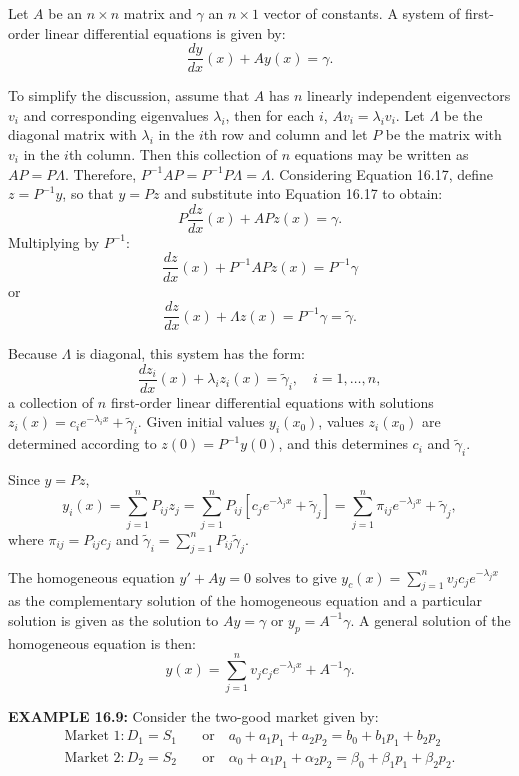 \begin{original}
Let $A$ be an $n \times n$ matrix and $\gamma$ an $n \times 1$ vector of constants. A system of first-order linear differential equations is given by:
\[
\frac{dy}{dx}(x) + A y(x) = \gamma. \tag{16.17}
\]

To simplify the discussion, assume that $A$ has $n$ linearly independent eigenvectors $v_i$ and corresponding eigenvalues $\lambda_i$, then for each $i$, $A v_i = \lambda_i v_i$. Let $\Lambda$ be the diagonal matrix with $\lambda_i$ in the $i$th row and column and let $P$ be the matrix with $v_i$ in the $i$th column. Then this collection of $n$ equations may be written as $AP = P\Lambda$. Therefore, $P^{-1}AP = P^{-1}P\Lambda = \Lambda$. Considering Equation 16.17, define $z = P^{-1} y$, so that $y = P z$ and substitute into Equation 16.17 to obtain:
\[
P\frac{dz}{dx}(x) + AP z(x) = \gamma.
\]
Multiplying by $P^{-1}$:
\[
\frac{dz}{dx}(x) + P^{-1}AP z(x) = P^{-1}\gamma
\]
or
\[
\frac{dz}{dx}(x) + \Lambda z(x) = P^{-1}\gamma = \tilde{\gamma}.
\]

Because $\Lambda$ is diagonal, this system has the form:
\[
\frac{dz_i}{dx}(x) + \lambda_i z_i(x) = \tilde{\gamma}_i, \quad i = 1, \ldots, n, \tag{16.18}
\]
a collection of $n$ first-order linear differential equations with solutions $z_i(x) = c_i e^{-\lambda_i x} + \tilde{\gamma}_i$. Given initial values $y_i(x_0)$, values $z_i(x_0)$ are determined according to $z(0) = P^{-1} y(0)$, and this determines $c_i$ and $\tilde{\gamma}_i$.

Since $y = P z$,
\[
y_i(x) = \sum_{j=1}^{n} P_{ij} z_j = \sum_{j=1}^{n} P_{ij}[c_j e^{-\lambda_j x} + \tilde{\gamma}_j] = \sum_{j=1}^{n} \pi_{ij} e^{-\lambda_j x} + \tilde{\gamma}_j, \tag{16.19}
\]
where $\pi_{ij} = P_{ij} c_j$ and $\tilde{\gamma}_i = \sum_{j=1}^{n} P_{ij} \tilde{\gamma}_j$.

The homogeneous equation $y' + A y = 0$ solves to give $y_c(x) = \sum_{j=1}^{n} v_j c_j e^{-\lambda_j x}$ as the complementary solution of the homogeneous equation and a particular solution is given as the solution to $A y = \gamma$ or $y_p = A^{-1}\gamma$. A general solution of the homogeneous equation is then:
\[
y(x) = \sum_{j=1}^{n} v_j c_j e^{-\lambda_j x} + A^{-1}\gamma.
\]

\textbf{EXAMPLE 16.9:} Consider the two-good market given by:
\begin{align*}
\text{Market 1}: D_1 = S_1 \quad &\text{or} \quad a_0 + a_1 p_1 + a_2 p_2 = b_0 + b_1 p_1 + b_2 p_2\\
\text{Market 2}: D_2 = S_2 \quad &\text{or} \quad \alpha_0 + \alpha_1 p_1 + \alpha_2 p_2 = \beta_0 + \beta_1 p_1 + \beta_2 p_2.
\end{align*}


\end{original}
